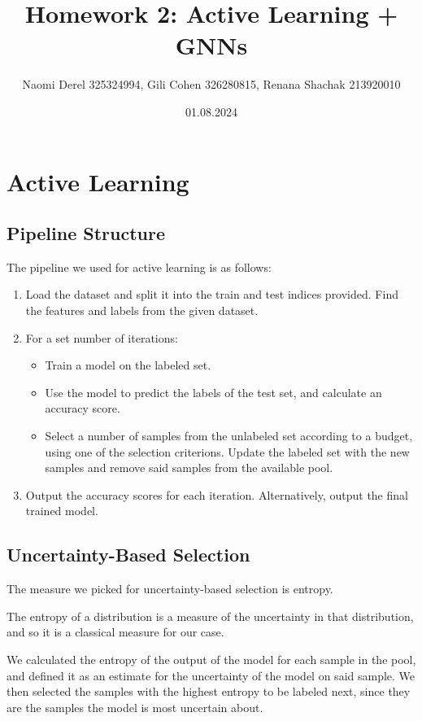 \documentclass[12pt]{article}
\begin{document}
\title{Homework 2: Active Learning + GNNs}
\author{Naomi Derel 325324994, Gili Cohen 326280815, Renana Shachak 213920010}
\date{01.08.2024}
\maketitle

\section{Active Learning}

\subsection{Pipeline Structure}

The pipeline we used for active learning is as follows:
\begin{enumerate}
    \item Load the dataset and split it into the train and test indices provided. Find the features and labels from the given dataset.
    \item For a set number of iterations:
    \begin{itemize}
        \item Train a model on the labeled set.
        \item Use the model to predict the labels of the test set, and calculate an accuracy score.
        \item Select a number of samples from the unlabeled set according to a budget, using one of the selection criterions. Update the labeled set with the new samples and remove said samples from the available pool.
    \end{itemize}
    \item Output the accuracy scores for each iteration. Alternatively, output the final trained model.
\end{enumerate}

\subsection{Uncertainty-Based Selection}

The measure we picked for uncertainty-based selection is entropy. 

The entropy of a distribution is a measure of the uncertainty in that distribution, and so it is a classical measure for our case. 

We calculated the entropy of the output of the model for each sample in the pool, and defined it as an estimate for the uncertainty of the model on said sample. We then selected the samples with the highest entropy to be labeled next, since they are the samples the model is most uncertain about.
\end{document}
